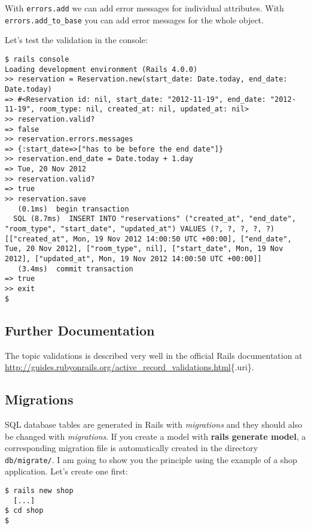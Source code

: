 \documentclass[a4paper]{book}
\newcounter{tab}[chapter]
\begin{document}
With \texttt{errors.add} we can add error messages for individual attributes. With \texttt{errors.add\_to\_base} you can add error messages for the whole object.

Let's test the validation in the console:

\begin{shaded}\begin{verbatim}
$ rails console
Loading development environment (Rails 4.0.0)
>> reservation = Reservation.new(start_date: Date.today, end_date: Date.today)
=> #<Reservation id: nil, start_date: "2012-11-19", end_date: "2012-11-19", room_type: nil, created_at: nil, updated_at: nil>
>> reservation.valid?
=> false
>> reservation.errors.messages
=> {:start_date=>["has to be before the end date"]}
>> reservation.end_date = Date.today + 1.day
=> Tue, 20 Nov 2012
>> reservation.valid?
=> true
>> reservation.save
   (0.1ms)  begin transaction
  SQL (8.7ms)  INSERT INTO "reservations" ("created_at", "end_date", "room_type", "start_date", "updated_at") VALUES (?, ?, ?, ?, ?)  [["created_at", Mon, 19 Nov 2012 14:00:50 UTC +00:00], ["end_date", Tue, 20 Nov 2012], ["room_type", nil], ["start_date", Mon, 19 Nov 2012], ["updated_at", Mon, 19 Nov 2012 14:00:50 UTC +00:00]]
   (3.4ms)  commit transaction
=> true
>> exit
$
\end{verbatim}\end{shaded}

\subsection{Further Documentation}\label{further-documentation}

The topic validations is described very well in the official Rails documentation at \url{http://guides.rubyonrails.org/active_record_validations.html}\{.uri\}.

\subsection{Migrations}\label{migrations}

SQL database tables are generated in Rails with \emph{migrations} and they should also be changed with \emph{migrations}. If you create a model with \textbf{rails generate model}, a corresponding migration file is automatically created in the directory \texttt{db/migrate/}. I am going to show you the principle using the example of a shop application. Let's create one first:

\begin{shaded}\begin{verbatim}
$ rails new shop
  [...]
$ cd shop
$
\end{verbatim}\end{shaded}
\end{document}
